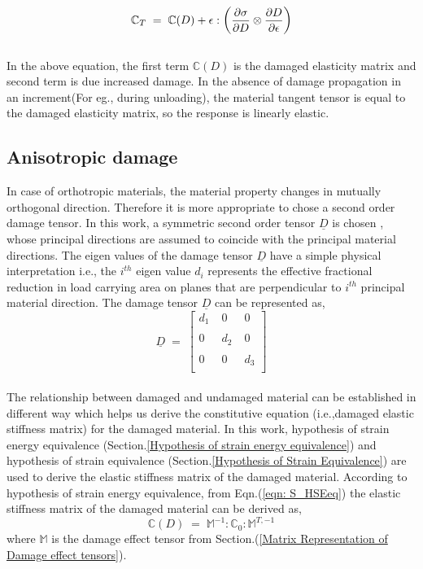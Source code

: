 \documentclass[a4paper,12pt,twoside]{report}
\begin{document}
\begin{equation}
\large{\mathbb{C}_{T}  \; = \; \mathbb{C}(D) + \epsilon : \Big(\frac{\partial \sigma }{\partial D} \otimes \frac{\partial D}{\partial \epsilon}  \Big)    }
\end{equation}
\\
In the above equation, the first term $\mathbb{C}(D)$ is the damaged elasticity matrix and second term is due increased damage. In the absence of damage propagation in an increment(For eg., during unloading), the material tangent tensor is equal to the damaged elasticity matrix, so the response is linearly elastic.
\subsection{Anisotropic damage}
\indent\indent\indent In case of orthotropic materials, the material property changes in mutually orthogonal direction. Therefore it is more appropriate to chose a second order damage tensor. In this work, a symmetric second order tensor $\underline{D}$ is chosen , whose principal directions are assumed to coincide with the principal material directions. The eigen values of the damage tensor $\underline{D}$ have a simple physical interpretation i.e., the $i^{th}$ eigen value $d_{i}$ represents the effective fractional reduction in load carrying area on planes that are perpendicular to $i^{th}$ principal material direction. The damage tensor $\underline{D}$ can be represented as,\\
$$
\underline{D} \; = \; 
 \begin{bmatrix}
  d_{1}  \;& 0  \; & 0  \\
  \\
  0 \; & d_{2} \; & 0  \\
  \\  
  0 \; & 0 \; & d_{3} \\
  
 \end{bmatrix}
 $$  
\\
The relationship between damaged and undamaged material can be established in different way which helps us derive the constitutive equation (i.e.,damaged elastic stiffness matrix) for the damaged material. In this work, hypothesis of strain energy equivalence (Section.\ref{Hypothesis of strain energy equivalence}) and hypothesis of strain equivalence (Section.\ref{Hypothesis of Strain Equivalence}) are used to derive the elastic stiffness matrix of the damaged material. According to hypothesis of strain energy equivalence, from Eqn.(\ref{eqn: S_HSEeq}) the elastic stiffness matrix of the damaged material can be derived as,\\
\begin{equation}
\mathbb{C}(D) \; = \; \mathbb{M}^{-1} : \mathbb{C}_{0} :  \mathbb{M}^{T,-1}  
\label{Damaged_elasticity_matrix_1}
\end{equation}
where $\mathbb{M}$ is the damage effect tensor from Section.(\ref{Matrix Representation of Damage effect tensors}). 
\end{document}
